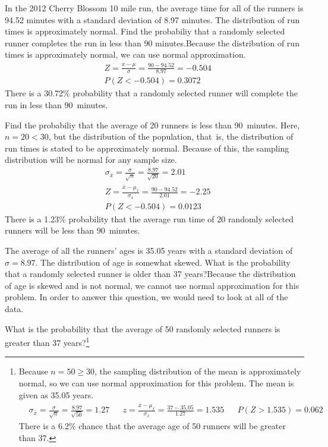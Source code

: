 \begin{example}{
In the 2012 Cherry Blossom 10 mile run, the average time for all of the runners is 94.52 minutes with a standard deviation of 8.97 minutes.  The distribution of run times is approximately normal.  Find the probabiliy that a randomly selected runner completes the run in less than 90 minutes.}Because the distribution of run times is approximately normal, we can use normal approximation.  
\begin{align*}
&Z = \frac{x - \mu}{\sigma}=\frac{90-94.52}{8.97}=-0.504 \\
&P(Z < -0.504) = 0.3072
\end{align*}
There is a 30.72\% probability that a randomly selected runner will complete the run in less than 90~minutes.
\end{example}

\begin{example}{
Find the probabiliy that the average of 20 runners is less than 90~minutes.}
Here, $n=20<30$, but the distribution of the population, that~is, the distribution of run times is stated to be approximately normal.  Because of this, the sampling distribution will be normal for any sample size.  
\begin{align*}
&\sigma_{\bar{x}}=\frac{\sigma}{\sqrt{n}}=\frac{8.97}{\sqrt{20}}=2.01 \\
&Z = \frac{\bar{x} - \mu_{\bar{x}}}{\sigma_{\bar{x}}}=\frac{90-94.52}{2.01}=-2.25\\
&P(Z < -0.504) = 0.0123
\end{align*}
There is a 1.23\% probability that the average run time of 20 randomly selected runners will be less than 90~minutes.
\end{example}

\begin{example}{
The average of all the runners' ages is 35.05 years with a standard deviation of $\sigma = 8.97$.  The distribution of age is somewhat skewed.  What is the probability that a randomly selected runner is older than 37 years?}Because the distribution of age is skewed and is not normal, we cannot use normal approximation for this problem.  In order to answer this question, we would need to look at all of the data.
\end{example}

\begin{exercise}
What is the probability that the average of 50 randomly selected runners is greater than 37 years?\footnote{Because $n=50\ge 30$, the sampling distribution of the mean is approximately normal, so we can use normal approximation for this problem.  The mean is given as 35.05 years.
\begin{align*}
&\sigma_{\bar{x}}
	= \frac{\sigma}{\sqrt{n}}
	= \frac{8.97}{\sqrt{50}}=1.27
&&z=\frac{\bar{x}-\mu_{\bar{x}}}{\sigma_{\bar{x}}} = \frac{37-35.05}{1.27}=1.535
&&P(Z > 1.535) = 0.062
\end{align*}
There is a 6.2\% chance that the average age of 50 runners will be greater than 37.} 
\end{exercise}

